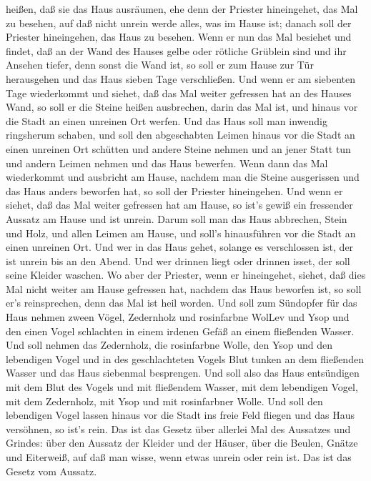 heißen, daß sie das Haus ausräumen, ehe denn der Priester hineingehet,
das Mal zu besehen, auf daß nicht unrein werde alles, was im Hause ist;
danach soll der Priester hineingehen, das Haus zu besehen. 
Wenn er nun das Mal besiehet und findet, daß an der Wand des Hauses
gelbe oder rötliche Grüblein sind und ihr Ansehen tiefer, denn sonst die
Wand ist,  so soll er zum Hause zur Tür herausgehen und das
Haus sieben Tage verschließen.  Und wenn er am siebenten
Tage wiederkommt und siehet, daß das Mal weiter gefressen hat an des
Hauses Wand,  so soll er die Steine heißen ausbrechen,
darin das Mal ist, und hinaus vor die Stadt an einen unreinen Ort
werfen.  Und das Haus soll man inwendig ringsherum schaben,
und soll den abgeschabten Leimen hinaus vor die Stadt an einen unreinen
Ort schütten  und andere Steine nehmen und an jener Statt
tun und andern Leimen nehmen und das Haus bewerfen.  Wenn
dann das Mal wiederkommt und ausbricht am Hause, nachdem man die Steine
ausgerissen und das Haus anders beworfen hat,  so soll der
Priester hineingehen. Und wenn er siehet, daß das Mal weiter gefressen
hat am Hause, so ist's gewiß ein fressender Aussatz am Hause und ist
unrein.  Darum soll man das Haus abbrechen, Stein und Holz,
und allen Leimen am Hause, und soll's hinausführen vor die Stadt an
einen unreinen Ort.  Und wer in das Haus gehet, solange es
verschlossen ist, der ist unrein bis an den Abend.  Und wer
drinnen liegt oder drinnen isset, der soll seine Kleider waschen.
 Wo aber der Priester, wenn er hineingehet, siehet, daß
dies Mal nicht weiter am Hause gefressen hat, nachdem das Haus beworfen
ist, so soll er's reinsprechen, denn das Mal ist heil worden.
 Und soll zum Sündopfer für das Haus nehmen zween Vögel,
Zedernholz und rosinfarbne WolLev und Ysop  und den einen
Vogel schlachten in einem irdenen Gefäß an einem fließenden Wasser.
 Und soll nehmen das Zedernholz, die rosinfarbne Wolle, den
Ysop und den lebendigen Vogel und in des geschlachteten Vogels Blut
tunken an dem fließenden Wasser und das Haus siebenmal besprengen.
 Und soll also das Haus entsündigen mit dem Blut des Vogels
und mit fließendem Wasser, mit dem lebendigen Vogel, mit dem Zedernholz,
mit Ysop und mit rosinfarbner Wolle.  Und soll den
lebendigen Vogel lassen hinaus vor die Stadt ins freie Feld fliegen und
das Haus versöhnen, so ist's rein.  Das ist das Gesetz über
allerlei Mal des Aussatzes und Grindes:  über den Aussatz
der Kleider und der Häuser,  über die Beulen, Gnätze und
Eiterweiß,  auf daß man wisse, wenn etwas unrein oder rein
ist. Das ist das Gesetz vom Aussatz.

